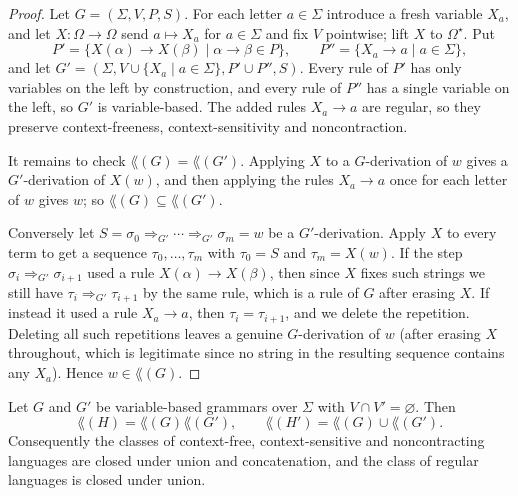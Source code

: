 \begin{proof}
	Let $G = (\Sigma, V, P, S)$. For each letter $a \in \Sigma$ introduce a fresh variable $X_a$, and let $X \colon \Omega \to \Omega$ send $a \mapsto X_a$ for $a \in \Sigma$ and fix $V$ pointwise; lift $X$ to $\Omega^\star$. Put
	$$P' = \{X(\alpha) \to X(\beta) \mid \alpha \to \beta \in P\}, \qquad P'' = \{X_a \to a \mid a \in \Sigma\},$$
	and let $G' = (\Sigma, V \cup \{X_a \mid a \in \Sigma\}, P' \cup P'', S)$. Every rule of $P'$ has only variables on the left by construction, and every rule of $P''$ has a single variable on the left, so $G'$ is variable-based. The added rules $X_a \to a$ are regular, so they preserve context-freeness, context-sensitivity and noncontraction.

	It remains to check $\lang(G) = \lang(G')$. Applying $X$ to a $G$-derivation of $w$ gives a $G'$-derivation of $X(w)$, and then applying the rules $X_a \to a$ once for each letter of $w$ gives $w$; so $\lang(G) \subseteq \lang(G')$.

	Conversely let $S = \sigma_0 \Rightarrow_{G'} \cdots \Rightarrow_{G'} \sigma_m = w$ be a $G'$-derivation. Apply $X$ to every term to get a sequence $\tau_0, \dots, \tau_m$ with $\tau_0 = S$ and $\tau_m = X(w)$. If the step $\sigma_i \Rightarrow_{G'} \sigma_{i+1}$ used a rule $X(\alpha) \to X(\beta)$, then since $X$ fixes such strings we still have $\tau_i \Rightarrow_{G'} \tau_{i+1}$ by the same rule, which is a rule of $G$ after erasing $X$. If instead it used a rule $X_a \to a$, then $\tau_i = \tau_{i+1}$, and we delete the repetition. Deleting all such repetitions leaves a genuine $G$-derivation of $w$ (after erasing $X$ throughout, which is legitimate since no string in the resulting sequence contains any $X_a$). Hence $w \in \lang(G)$.
\end{proof}

\begin{theorem}\label{thm:closureunionconcat}
	Let $G$ and $G'$ be variable-based grammars over $\Sigma$ with $V \cap V' = \varnothing$. Then
	$$\lang(H) = \lang(G)\lang(G'), \qquad \lang(H') = \lang(G) \cup \lang(G').$$
	Consequently the classes of context-free, context-sensitive and noncontracting languages are closed under union and concatenation, and the class of regular languages is closed under union.
\end{theorem}

